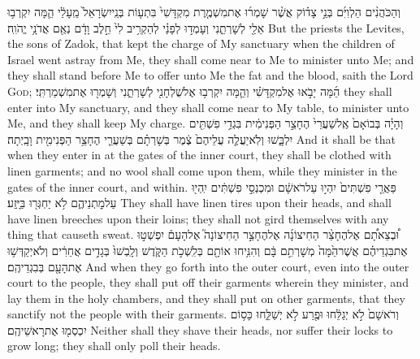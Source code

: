 \label{haft_31}
\setcounter{chap}{44}
\setcounter{verse}{15}
{וְהַכֹּהֲנִ֨ים הַלְוִיִּ֜ם בְּנֵ֣י צָד֗וֹק אֲשֶׁ֨ר שָׁמְר֜וּ אֶת\maqqaf מִשְׁמֶ֤רֶת מִקְדָּשִׁי֙ בִּתְע֤וֹת בְּנֵֽי\maqqaf יִשְׂרָאֵל֙ מֵֽעָלַ֔י הֵ֛מָּה יִקְרְב֥וּ אֵלַ֖י לְשָׁרְתֵ֑נִי וְעָמְד֣וּ לְפָנַ֗י לְהַקְרִ֥יב לִי֙ חֵ֣לֶב וָדָ֔ם נְאֻ֖ם אֲדֹנָ֥י יֱהֹוִֽה׃}
{But the priests the Levites, the sons of Zadok, that kept the charge of My sanctuary when the children of Israel went astray from Me, they shall come near to Me to minister unto Me; and they shall stand before Me to offer unto Me the fat and the blood, saith the Lord \textsc{God};}
{הֵ֜מָּה יָבֹ֣אוּ אֶל\maqqaf מִקְדָּשִׁ֗י וְהֵ֛מָּה יִקְרְב֥וּ אֶל\maqqaf שֻׁלְחָנִ֖י לְשָׁרְתֵ֑נִי וְשָׁמְר֖וּ אֶת\maqqaf מִשְׁמַרְתִּֽי׃}
{they shall enter into My sanctuary, and they shall come near to My table, to minister unto Me, and they shall keep My charge.}
{וְהָיָ֗ה בְּבוֹאָם֙ אֶֽל\maqqaf שַׁעֲרֵי֙ הֶחָצֵ֣ר הַפְּנִימִ֔ית בִּגְדֵ֥י פִשְׁתִּ֖ים יִלְבָּ֑שׁוּ וְלֹֽא\maqqaf יַעֲלֶ֤ה עֲלֵיהֶם֙ צֶ֔מֶר בְּשָׁרְתָ֗ם בְּשַׁעֲרֵ֛י הֶחָצֵ֥ר הַפְּנִימִ֖ית וָבָֽיְתָה׃}
{And it shall be that when they enter in at the gates of the inner court, they shall be clothed with linen garments; and no wool shall come upon them, while they minister in the gates of the inner court, and within.}
{פַּאֲרֵ֤י פִשְׁתִּים֙ יִהְי֣וּ עַל\maqqaf רֹאשָׁ֔ם וּמִכְנְסֵ֣י פִשְׁתִּ֔ים יִֽהְי֖וּ עַל\maqqaf מׇתְנֵיהֶ֑ם לֹ֥א יַחְגְּר֖וּ בַּיָּֽזַע׃}
{They shall have linen tires upon their heads, and shall have linen breeches upon their loins; they shall not gird themselves with any thing that causeth sweat.}
{וּ֠בְצֵאתָ֠ם אֶל\maqqaf הֶחָצֵ֨ר הַחִיצוֹנָ֜ה אֶל\maqqaf הֶחָצֵ֣ר הַחִיצוֹנָה֮ אֶל\maqqaf הָעָם֒ יִפְשְׁט֣וּ אֶת\maqqaf בִּגְדֵיהֶ֗ם אֲשֶׁר\maqqaf הֵ֙מָּה֙ מְשָׁרְתִ֣ם בָּ֔ם וְהִנִּ֥יחוּ אוֹתָ֖ם בְּלִֽשְׁכֹ֣ת הַקֹּ֑דֶשׁ וְלָֽבְשׁוּ֙ בְּגָדִ֣ים אֲחֵרִ֔ים וְלֹא\maqqaf יְקַדְּשׁ֥וּ אֶת\maqqaf הָעָ֖ם בְּבִגְדֵיהֶֽם׃}
{And when they go forth into the outer court, even into the outer court to the people, they shall put off their garments wherein they minister, and lay them in the holy chambers, and they shall put on other garments, that they sanctify not the people with their garments.}
{וְרֹאשָׁם֙ לֹ֣א יְגַלֵּ֔חוּ וּפֶ֖רַע לֹ֣א יְשַׁלֵּ֑חוּ כָּס֥וֹם יִכְסְמ֖וּ אֶת\maqqaf רָאשֵׁיהֶֽם׃}
{Neither shall they shave their heads, nor suffer their locks to grow long; they shall only poll their heads.}
